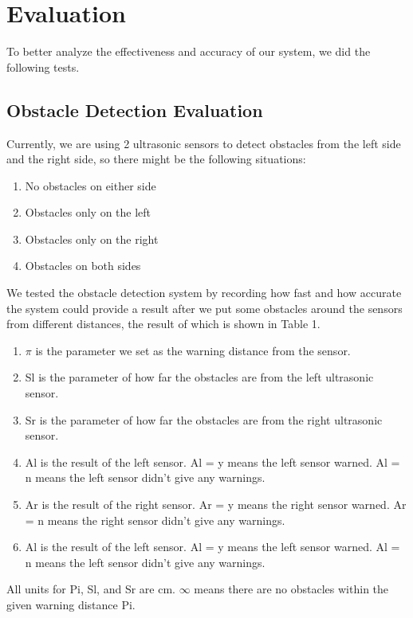 \section{Evaluation}
To better analyze the effectiveness and accuracy of our system, we did the following tests.

\subsection{Obstacle Detection Evaluation}
Currently, we are using 2 ultrasonic sensors to detect obstacles from the left side and the right side, so there might be the following situations:

\begin{enumerate}
  \item No obstacles on either side
  \item Obstacles only on the left
  \item Obstacles only on the right
  \item Obstacles on both sides
\end{enumerate}

We tested the obstacle detection system by recording how fast and how accurate the system could provide a result after we put some obstacles around the sensors from different distances, the result of which is shown in Table 1.

\begin{enumerate}
  \item $\pi$ is the parameter we set as the warning distance from the sensor.
  \item Sl is the parameter of how far the obstacles are from the left ultrasonic sensor.
  \item Sr is the parameter of how far the obstacles are from the right ultrasonic sensor.
  \item Al is the result of the left sensor. Al = y means the left sensor warned. Al = n means the left sensor didn’t give any warnings.
  \item Ar is the result of the right sensor. Ar = y means the right sensor warned. Ar = n means the right sensor didn’t give any warnings.
  \item Al is the result of the left sensor. Al = y means the left sensor warned. Al = n means the left sensor didn’t give any warnings.
\end{enumerate}

All units for Pi, Sl, and Sr are cm. $\infty$ means there are no obstacles within the given warning distance Pi.

